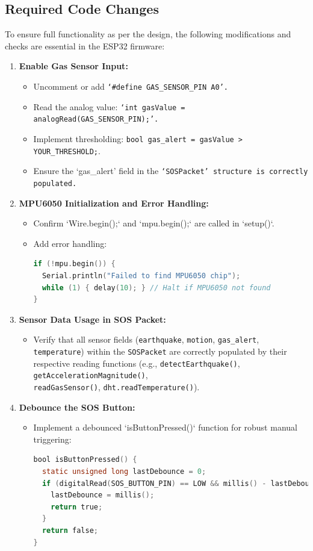 \documentclass[12pt, a4paper]{article}
\begin{document}
\subsection{Required Code Changes}
To ensure full functionality as per the design, the following modifications and checks are essential in the ESP32 firmware:
\begin{enumerate}
    \item \textbf{Enable Gas Sensor Input:}
    \begin{itemize}
        \item Uncomment or add \texttt{`\#define GAS\_SENSOR\_PIN A0'.}
        \item Read the analog value: \texttt{`int gasValue = analogRead(GAS\_SENSOR\_PIN);'.}
        \item Implement thresholding: \texttt{bool gas\_alert = gasValue > YOUR\_THRESHOLD;}.
        \item Ensure the `gas\_alert' field in the \texttt{`SOSPacket' structure is correctly populated.}
    \end{itemize}
    \item \textbf{MPU6050 Initialization and Error Handling:}
    \begin{itemize}
        \item Confirm `Wire.begin();` and `mpu.begin();` are called in `setup()`.
        \item Add error handling:
        \begin{lstlisting}[language=C]
if (!mpu.begin()) {
  Serial.println("Failed to find MPU6050 chip");
  while (1) { delay(10); } // Halt if MPU6050 not found
}
        \end{lstlisting}
    \end{itemize}
    \item \textbf{Sensor Data Usage in SOS Packet:}
    \begin{itemize}
        \item Verify that all sensor fields (\texttt{earthquake}, \texttt{motion}, \texttt{gas\_alert}, \texttt{temperature}) within the \texttt{SOSPacket} are correctly populated by their respective reading functions (e.g., \texttt{detectEarthquake()}, \texttt{getAccelerationMagnitude()}, \\
        \texttt{readGasSensor()}, \texttt{dht.readTemperature()}).
    \end{itemize}
    \item \textbf{Debounce the SOS Button:}
    \begin{itemize}
        \item Implement a debounced `isButtonPressed()` function for robust manual triggering:
        \begin{lstlisting}[language=C]
bool isButtonPressed() {
  static unsigned long lastDebounce = 0;
  if (digitalRead(SOS_BUTTON_PIN) == LOW && millis() - lastDebounce > 300) {
    lastDebounce = millis();
    return true;
  }
  return false;
}
        \end{lstlisting}
    \end{itemize}
\end{enumerate}
\end{document}
